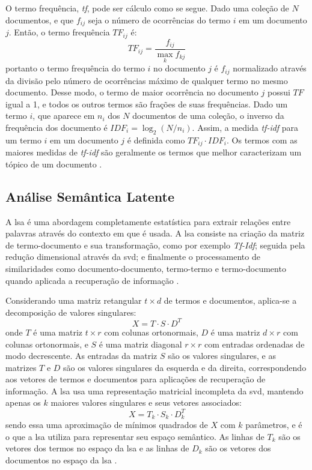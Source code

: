 O termo frequência, \textit{tf}, pode ser cálculo como se segue. Dado uma coleção de $N$ documentos, e que $f_{ij}$ seja o número de ocorrências do termo $i$ em um documento $j$. Então, o termo frequência ${TF}_{ij}$ é:
\begin{equation}
    \label{eq:tf}
    {TF}_{ij} = \frac{f_{ij}}{\max_k f_{kj}}
\end{equation}
portanto o termo frequência do termo $i$ no documento $j$ é $f_{ij}$ normalizado através da divisão pelo número de ocorrências máximo de qualquer termo no mesmo documento. Desse modo, o termo de maior ocorrência no documento $j$ possui $TF$ igual a 1, e todos os outros termos são frações de suas frequências. Dado um termo $i$, que aparece em $n_i$ dos $N$ documentos de uma coleção, o inverso da frequência dos documento é $IDF_i = \log_2(N/n_i)$. Assim, a medida \textit{tf-idf} para um termo $i$ em um documento $j$ é definida como
${TF}_{ij} \cdot {IDF}_i$. Os termos com as maiores medidas de \textit{tf-idf} são geralmente os termos que melhor caracterizam um tópico de um documento \cite{Rajaraman2011Mining}.

\subsection{Análise Semântica Latente} \label{sec:word-embedding-lsa}

A \gls{lsa} é uma abordagem completamente estatística para extrair relações entre palavras através do contexto em que é usada. A \gls{lsa} consiste na criação da matriz de termo-documento e sua transformação, como por exemplo \textit{Tf-Idf}; seguida pela redução dimensional através da \gls{svd}; e finalmente o processamento de similaridades como documento-documento, termo-termo e termo-documento quando aplicada a recuperação de informação \cite{Dumais2004LatentSA}.

Considerando uma matriz retangular $t \times d$ de termos e documentos, aplica-se a decomposição de valores singulares:
\begin{equation}
    \label{eq:lsa_svd}
    X = T \cdot S \cdot D^T
\end{equation}
onde $T$ é uma matriz $t \times r$ com colunas ortonormais, $D$ é uma matriz $d \times r$ com colunas ortonormais, e $S$ é uma matriz diagonal $r \times r$ com entradas ordenadas de modo decrescente. As entradas da matriz $S$ são os valores singulares, e as matrizes $T$ e $D$ são os valores singulares da esquerda e da direita, correspondendo aos vetores de termos e documentos para aplicações de recuperação de informação. A \gls{lsa} usa uma representação matricial incompleta da \gls{svd}, mantendo apenas os $k$ maiores valores singulares e seus vetores associados:
\begin{equation}
    \label{eq:lsa_svd_reduced_dimension}
    X = T_k \cdot S_k \cdot D_k^T
\end{equation}
sendo essa uma aproximação de mínimos quadrados de $X$ com $k$ parâmetros, e é o que a \gls{lsa} utiliza para representar seu espaço semântico. As linhas de $T_k$ são os vetores dos termos no espaço da \gls{lsa} e as linhas de $D_k$ são os vetores dos documentos no espaço da \gls{lsa} \cite{Dumais2004LatentSA}.

